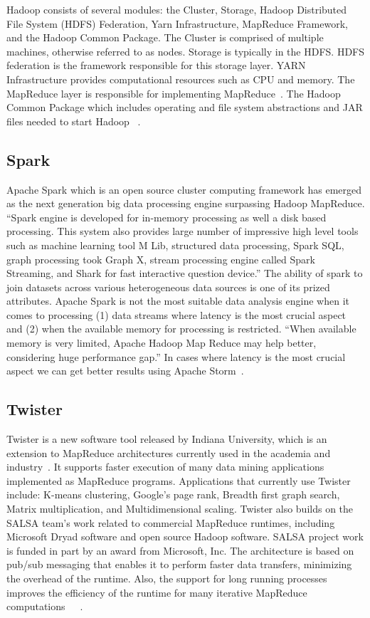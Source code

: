 Hadoop consists of several modules: the Cluster, Storage, Hadoop
Distributed File System (HDFS) Federation, Yarn Infrastructure,
MapReduce Framework, and the Hadoop Common Package.  The Cluster is
comprised of multiple machines, otherwise referred to as nodes.
Storage is typically in the HDFS.  HDFS federation is the framework
responsible for this storage layer.  YARN Infrastructure provides
computational resources such as CPU and memory. The MapReduce layer is
responsible for implementing MapReduce~\cite{www-hadooparch2}.  The
Hadoop Common Package which includes operating and file system
abstractions and JAR files needed to start Hadoop
~\cite{www-wikihadoop}.


\subsection{Spark}

Apache Spark which is an open source cluster computing framework has
emerged as the next generation big data processing engine surpassing
Hadoop MapReduce. ``Spark engine is developed for in-memory processing
as well a disk based processing. This system also provides large
number of impressive high level tools such as machine learning tool M
Lib, structured data processing, Spark SQL, graph processing took
Graph X, stream processing engine called Spark Streaming, and Shark
for fast interactive question device.'' The ability of spark to join
datasets across various heterogeneous data sources is one of its
prized attributes. Apache Spark is not the most suitable data analysis
engine when it comes to processing (1) data streams where latency is
the most crucial aspect and (2) when the available memory for
processing is restricted. ``When available memory is very limited,
Apache Hadoop Map Reduce may help better, considering huge performance
gap.'' In cases where latency is the most crucial aspect we can get
better results using Apache Storm~\cite{www-spark}.
     
\subsection{Twister}

Twister is a new software tool released by Indiana University, which
is an extension to MapReduce architectures currently used in the
academia and industry~\cite{www-twister1}. It supports faster
execution of many data mining applications implemented as MapReduce
programs. Applications that currently use Twister include: K-means
clustering, Google's page rank, Breadth first graph search, Matrix
multiplication, and Multidimensional scaling. Twister also builds on
the SALSA team's work related to commercial MapReduce runtimes,
including Microsoft Dryad software and open source Hadoop
software. SALSA project work is funded in part by an award from
Microsoft, Inc. The architecture is based on pub/sub messaging that
enables it to perform faster data transfers, minimizing the overhead
of the runtime. Also, the support for long running processes improves
the efficiency of the runtime for many iterative MapReduce
computations~\cite{www-twister2}~\cite{www-twister3}~\cite{paper-twister}.

